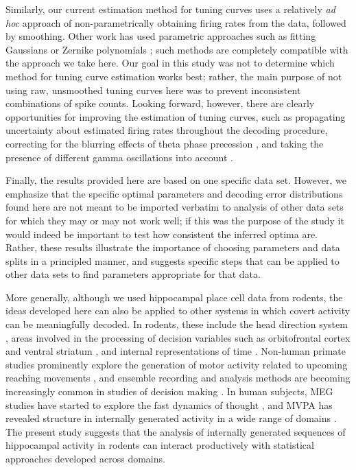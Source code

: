 \documentclass[11pt]{article}
\let\cite=\citep
\begin{document}
Similarly, our current estimation method for tuning curves uses a
relatively {\it ad hoc} approach of non-parametrically obtaining
firing rates from the data, {\color{red} followed by smoothing}. Other
work has used parametric approaches such as fitting Gaussians or
Zernike polynomials \cite{Barbieri2002}; such methods are completely
compatible with the approach we take here. Our goal in this study was
not to determine which method for tuning curve estimation works best;
rather, the main purpose of {\color{red} not using raw, unsmoothed
  tuning curves} here was to prevent inconsistent combinations of
spike counts. Looking forward, however, there are clearly
opportunities for improving the estimation of tuning curves, such as
propagating uncertainty about estimated firing rates throughout the
decoding procedure, correcting for the blurring effects of theta phase
precession \cite{Lisman2009}, and taking the presence of different
gamma oscillations into account \cite{Zheng2016}.

Finally, the results provided here are based on one specific data
set. However, we emphasize that the specific optimal parameters and
decoding error distributions found here are not meant to be imported
verbatim to analysis of other data sets for which they may or may not
work well; if this was the purpose of the study it would indeed be
important to test how consistent the inferred optima are. Rather,
these results illustrate the importance of choosing parameters and
data splits in a principled manner, and suggests specific steps that
can be applied to other data sets to find parameters appropriate for
that data.

More generally, although we used hippocampal place cell data from
rodents, the ideas developed here can also be applied to other systems
in which covert activity can be meaningfully decoded. In rodents,
these include the head direction system \cite{Peyrache2015}, areas
involved in the processing of decision variables such as orbitofrontal
cortex and ventral striatum \cite{Stott2014}, {\color{red} and
  internal representations of time
  \cite{Pastalkova2008,MacDonald2013,Mello2015}}. Non-human primate
studies prominently explore the generation of motor activity related
to upcoming reaching movements \cite{Wu2006,Yu2009a}, and ensemble
recording and analysis methods are becoming increasingly common in
studies of decision making \cite{Rich2016}. In human subjects, MEG
studies have started to explore the fast dynamics of thought
\cite{King2014,Bellmund2016,Kurth-Nelson2016}, and MVPA has revealed
structure in internally generated activity in a wide range of domains
\cite{Reddy2010,Brown2016}. The present study suggests that the
analysis of internally generated sequences of hippocampal activity in
rodents can interact productively with statistical approaches
developed across domains.
\end{document}
